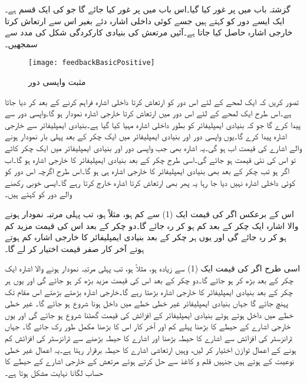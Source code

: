  
گزشتہ باب میں  پر غور کیا گیا۔اس باب میں  پر غور کیا جائے گا جو  کی ایک قسم ہے۔ ایک ایسے دور کو کہتے ہیں جسے کوئی داخلی اشارہ دئے بغیر اس سے ارتعاش کرتا خارجی اشارہ حاصل کیا جاتا ہے۔آئیں مرتعش کی بنیادی کارکردگی شکل  کی مدد سے سمجھیں۔ 
\begin{figure}
\centering
\texttt{[image: feedbackBasicPositive]}
\caption{مثبت واپسی دور}
\label{شکل_بنیادی_مثبت_واپسی_دور}
\end{figure}
تصور کریں کہ ایک لمحے کے لئے اس دور کو ارتعاش کرتا داخلی اشارہ  فراہم کرنے کے بعد  کر دیا جاتا ہے۔اس طرح ایک لمحے کے لئے اس دور میں  ارتعاش کرتا خارجی اشارہ  نمودار ہو  گا۔واپسی دور  سے  پیدا کرے گا جو کہ بنیادی ایمپلیفائر کو بطور داخلی اشارہ مہیا کیا گیا ہے۔بنیادی ایمپلیفائر  سے خارجی اشارہ  پیدا کرے گا۔یوں واپسی دور اور بنیادی ایمپلیفائر میں ایک چکر کے بعد پہلی بار نمودار ہونے والے اشارے  کی قیمت اب  ہو گی۔یہ اشارہ بھی جب واپسی دور اور بنیادی ایمپلیفائر میں ایک چکر کاٹے تو اس کی نئی قیمت  ہو جائے گی۔اسی طرح  چکر کے بعد بنیادی ایمپلیفائر کا خارجی اشارہ  ہو گا۔اب اگر  ہو تب  چکر کے بعد بھی بنیادی ایمپلیفائر کا خارجی اشارہ  ہی ہو گا۔اس طرح اگرچہ اس دور کو کوئی داخلی اشارہ نہیں دیا جا رہا یہ پھر بھی ارتعاش کرتا اشارہ  خارج کرتا رہے گا۔ایسی خوبی رکھنے والے دور کو   کہتے ہیں۔

اس کے برعکس اگر  کی قیمت ایک (1) سے کم ہو، مثلاً  ہو، تب پہلی مرتبہ نمودار ہونے والا اشارہ  ایک چکر کے بعد کم ہو کر  رہ جائے گا۔دو چکر کے بعد اس کی قیمت مزید کم ہو کر  رہ جائے گی اور یوں ہر چکر کے بعد بنیادی ایمپلیفائر کا خارجی اشارہ کم ہوتے ہوتے آخر کار صفر قیمت اختیار کر لے گا۔

اسی طرح  اگر   کی قیمت ایک (1) سے زیادہ ہو، مثلاً  ہو، تب پہلی مرتبہ نمودار ہونے والا اشارہ  ایک چکر کے بعد بڑھ کر  ہو جائے گا۔دو چکر کے بعد اس کی قیمت مزید بڑھ کر  ہو جائے گی اور یوں ہر چکر کے بعد بنیادی ایمپلیفائر کا خارجی اشارہ بڑھتا رہے گا۔خارجی اشارہ بڑھتے بڑھتے اس مقام تک پہنچ جائے گا جہاں بنیادی ایمپلیفائر غیر خطی خطے میں داخل ہونا شروع ہو جائے گا۔ غیر خطی خطے میں داخل ہوتے ہوئے بنیادی ایمپلیفائر کے افزائش کی قیمت گھٹنا شروع ہو جائے گی اور یوں خارجی اشارے کے حیطے کا بڑھنا پہلے کم اور آخر کار اس کا بڑھنا مکمل طور   رک  جائے  گا۔ جہاں ٹرانزسٹر کی افزائش سے اشارے کا حیطہ بڑھنا اور اشارے کا حیطہ بڑھنے سے ٹرانزسٹر کی افزائش کم ہونے کے اعمال توازن اختیار کر لیں، وہیں ارتعاشی اشارے کا حیطہ برقرار رہتا ہے۔یہ اعمال غیر خطی نوعیت کے ہوتے ہیں جنہیں قلم و کاغذ سے حل کرتے ہوئے مرتعش کے خارجی اشارے کے حیطے کا حساب لگانا نہایت مشکل ہوتا ہے۔

